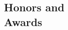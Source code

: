 \documentclass[margin,line,pifont,palatino,courier]{res}
\begin{document}
\begin{resume}


\section{\sc Honors and\\ Awards}


\end{resume}
\end{document}
